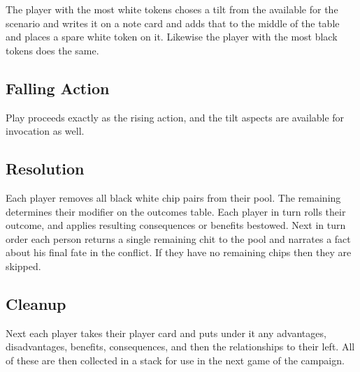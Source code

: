 The player with the most white tokens choses a tilt from the available for the scenario and writes it on a note card and adds that to the middle of the table and places a spare white token on it. Likewise the player with the most black tokens does the same.

\subsection{Falling Action}

Play proceeds exactly as the rising action, and the tilt aspects are available for invocation as well. 

\subsection{Resolution}

Each player removes all black white chip pairs from their pool. The remaining determines their modifier on the outcomes table. Each player in turn rolls their outcome, and applies resulting consequences or benefits bestowed. Next in turn order each person returns a single remaining chit to the pool and narrates a fact about his final fate in the conflict. If they have no remaining chips then they are skipped.

\subsection{Cleanup}

Next each player takes their player card and puts under it any advantages, disadvantages, benefits, consequences, and then the relationships to their left. All of these are then collected in a stack for use in the next game of the campaign.